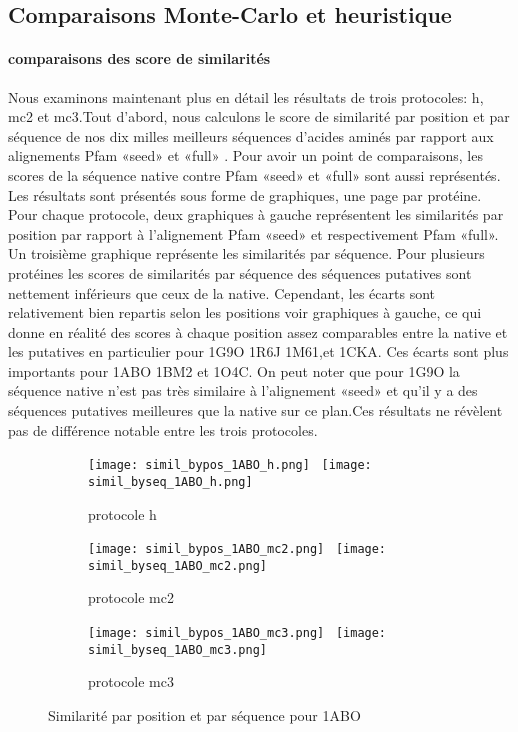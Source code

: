   \subsection{Comparaisons Monte-Carlo et heuristique}
   \paragraph{comparaisons des score de similarités}
Nous examinons maintenant plus en détail les résultats de trois protocoles: h, mc2 et mc3.Tout d'abord, nous calculons le score de similarité par position et par séquence de nos dix milles meilleurs  séquences d'acides aminés par rapport aux alignements Pfam «seed» et «full» . Pour avoir un point de comparaisons, les scores  de la séquence native contre Pfam «seed» et «full»  sont aussi représentés. Les résultats sont présentés sous forme de graphiques, une page par protéine. Pour chaque protocole, deux graphiques à gauche  représentent les similarités par position par rapport à l'alignement Pfam «seed» et respectivement Pfam «full». Un troisième graphique représente les similarités par séquence.  Pour plusieurs protéines les scores de similarités par séquence  des séquences putatives sont nettement inférieurs que ceux de la native. Cependant, les écarts sont relativement bien repartis selon les positions voir graphiques à gauche, ce qui donne en réalité des scores à chaque position assez comparables entre la native et les putatives en particulier pour   1G9O  1R6J 1M61,et 1CKA. Ces écarts sont plus importants pour 1ABO 1BM2 et 1O4C. On peut noter que pour 1G9O la séquence native n'est pas très similaire à l'alignement «seed» et qu'il y a des séquences putatives meilleures que la native sur ce plan.Ces résultats ne révèlent pas de différence notable entre les trois protocoles.



\captionsetup[subfigure]{font=scriptsize}

   \begin{figure}
   \begin{subfigure}[b]{\linewidth}
     \centering
          \texttt{[image: simil\_bypos\_1ABO\_h.png]}~
          \texttt{[image: simil\_byseq\_1ABO\_h.png]} 
     \caption{protocole h}
   \end{subfigure}

   \begin{subfigure}[b]{\linewidth}
     \centering
          \texttt{[image: simil\_bypos\_1ABO\_mc2.png]}~ 
          \texttt{[image: simil\_byseq\_1ABO\_mc2.png]} 
     \caption{protocole mc2}
   \end{subfigure}

   \begin{subfigure}[b]{\linewidth}
     \centering
          \texttt{[image: simil\_bypos\_1ABO\_mc3.png]}~  
          \texttt{[image: simil\_byseq\_1ABO\_mc3.png]} 
     \caption{protocole mc3}
   \end{subfigure}

     \caption{Similarité par position et par séquence pour 1ABO}
\label{grah:simil_1ABO}
   \end{figure}

